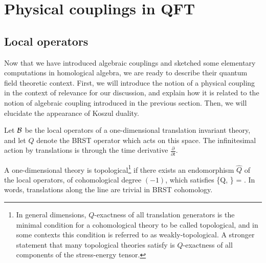 \documentclass[11pt]{amsart}
\begin{document}
\section{Physical couplings in QFT}\label{s:lagcoupling}


\subsection{Local operators}

Now that we have introduced algebraic couplings and sketched some elementary computations in homological algebra, we are ready to describe their quantum field theoretic context. First, we will introduce the notion of a physical coupling in the context of relevance for our discussion, and explain how it is related to the notion of algebraic coupling introduced in the previous section. Then, we will elucidate the appearance of Koszul duality. 

Let $\mathcal B$ be the local operators of a one-dimensional translation invariant theory, and let $Q$ denote the BRST operator which acts on this space. 
The infinitesimal action by translations is through the time derivative $\frac{\partial}{\partial t}$. 

A one-dimensional theory is topological\footnote{In general dimensions, $Q$-exactness of all translation generators is the minimal condition for a cohomological theory to be called topological, and in some contexts this condition is referred to as weakly-topological. A stronger statement that many topological theories satisfy is $Q$-exactness of all components of the stress-energy tensor.} if there exists an endomorphism $\hat{Q}$ of the local operators, of cohomological degree $(-1)$, which satisfies
\beqn\label{eqn:triv}
\{Q, \} =  .
\eeqn
In words, translations along the line are trivial in BRST cohomology. 
\end{document}
